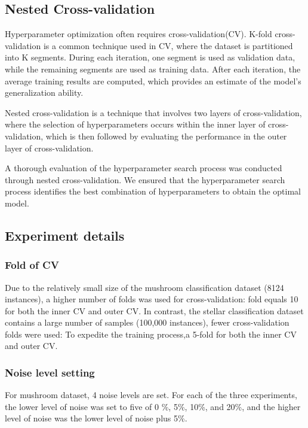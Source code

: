 \documentclass[runningheads,a4paper]{llncs}
\begin{document}
\subsection{Nested Cross-validation}
Hyperparameter optimization often requires cross-validation(CV). K-fold cross-validation is a common technique used in CV, where the dataset is partitioned into K segments. During each iteration, one segment is used as validation data, while the remaining segments are used as training data. After each iteration, the average training results are computed, which provides an estimate of the model's generalization ability.

Nested cross-validation\cite{https://doi.org/10.1111/j.2517-6161.1974.tb00994.x} is a technique that involves two layers of cross-validation, where the selection of hyperparameters occurs within the inner layer of cross-validation, which is then followed by evaluating the performance in the outer layer of cross-validation.

A thorough evaluation of the hyperparameter search process was conducted through nested cross-validation. We ensured that the hyperparameter search process identifies the best combination of hyperparameters to obtain the optimal model.

\subsection{Experiment details}

\subsubsection{Fold of CV}
Due to the relatively small size of the mushroom classification dataset (8124 instances), a higher number of folds was used for cross-validation: fold equals 10  for both the inner CV and outer CV. In contrast, the stellar classification dataset contains a large number of samples (100,000 instances), fewer cross-validation folds were used: To expedite the training process,a 5-fold for both the inner CV and outer CV.

\subsubsection{Noise level setting}
For mushroom dataset, 4 noise levels are set.
For each of the three experiments, the lower level of noise was set to five of 0 \%, 5\%, 10\%, and 20\%, and the higher level of noise was the lower level of noise plus 5\%.
\end{document}
